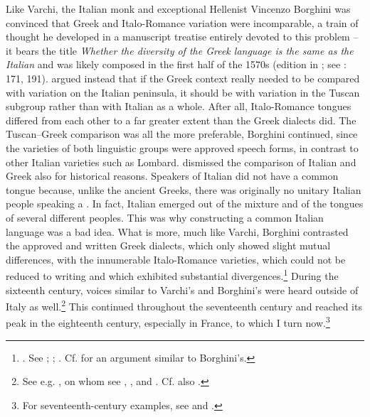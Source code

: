Like Varchi, the Italian monk and exceptional Hellenist Vincenzo Borghini was convinced that Greek and Italo-Romance variation were incomparable, a train of thought he developed in a manuscript treatise entirely devoted to this problem – it bears the title \textit{Whether the diversity of the Greek language is the same as the Italian} and was likely composed in the first half of the 1570s (edition in \citealt{Borghini1971}; see \citealt{Alinei1984}: 171, 191). \citet[335]{Borghini1971} argued instead that if the Greek context really needed to be compared with variation on the Italian peninsula, it should be with variation in the Tuscan subgroup rather than with Italian as a whole. After all, Italo-Romance tongues differed from each other to a far greater extent than the Greek dialects did. The Tuscan–Greek comparison was all the more preferable, Borghini continued, since the varieties of both linguistic groups were approved speech forms, in contrast to other Italian varieties such as Lombard. \citet[338--340]{Borghini1971} dismissed the comparison of Italian and Greek also for historical reasons. Speakers of Italian did not have a common tongue because, unlike the ancient Greeks, there was originally no unitary Italian people speaking a . In fact, Italian emerged out of the mixture and  of the tongues of several different peoples. This was why constructing a common Italian language was a bad idea. What is more, much like Varchi, Borghini contrasted the approved and written Greek dialects, which only showed slight mutual differences, with the innumerable Italo-Romance varieties, which could not be reduced to writing and which exhibited substantial divergences.\footnote{\citet[341]{Borghini1971}. See \citet[171]{Alinei1984}; \citet[210]{Trovato1984}; \citet[32--37]{Beninca1988}. Cf. \citet[253--254]{Salviati1588} for an argument similar to Borghini’s.} During the sixteenth century, voices similar to Varchi’s and Borghini’s were heard outside of Italy as well.\footnote{See e.g. \citet[595--596]{Wolf1578}, on whom see \citet{Von1856}, \citet[58–59]{Jellinek1898, Jellinek1913}, and \citet[esp. 214--218]{Mattheier2003}. Cf. also \citet[xiii.\textsc{\textsuperscript{v}}]{Palsgrave1530}.} This continued throughout the seventeenth century and reached its peak in the eighteenth century, especially in France, to which I turn now.\footnote{For seventeenth-century examples, see \citet[458--459]{Mambrun1661} and \citet[146--147]{Morhof1685}.}

